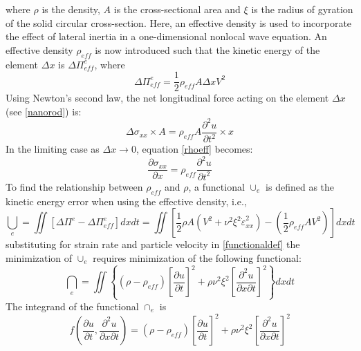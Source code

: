 where $\rho$ is the density, $A$ is the cross-sectional area and $\xi$ is the
radius of gyration of the solid circular cross-section. Here, an
effective density is used to incorporate the effect of lateral inertia in
a one-dimensional nonlocal wave equation. An effective density $\rho_{eff}$ is now introduced such that the kinetic energy of the element $\Delta x$ is $\Delta \Pi^e_{eff}$, where\\
\begin{equation}
\Delta \Pi^e_{eff} =\frac{1}{2} \rho_{eff} A \Delta x V^2
\end{equation}
Using Newton’s second law, the net longitudinal force acting on the
element $\Delta x$ (see \ref{nanorod}) is:\\
\begin{equation}
\Delta \sigma_{xx} \times A = \rho_{eff} A \frac{\partial^2 u}{\partial t^2} \times x
\label{rhoeff}
\end{equation}
In the limiting case as $\Delta x \rightarrow 0$, equation \ref{rhoeff} becomes:\\
\begin{equation}
\frac{\partial \sigma_{xx}}{\partial x} = \rho_{eff} \frac{\partial^2 u}{\partial t^2}
\label{limcasesigma}
\end{equation}
To find the relationship between $\rho_{eff}$ and $\rho$, a functional $\cup_e$ is defined as the kinetic energy error when using the effective density, i.e.,\\
\begin{equation}
\bigcup_e = \iint [\Delta \Pi^e - \Delta \Pi^e_{eff} ] dx dt = 
\iint \left[ \dfrac{1}{2} \rho A (V^2 + \nu^2 \xi^2 \dot{\varepsilon}^2_{xx}) - 
\left( \dfrac{1}{2} \rho_{eff} A V^2 \right) \right] dx dt
\label{functionaldef}
\end{equation}
substituting for strain rate and particle velocity in \eqref{functionaldef} the
minimization of $\cup_e$ requires minimization of the following functional:\\
\begin{equation}
\bigcap_e = \iint \left\lbrace (\rho - \rho_{eff}) \left[\dfrac{\partial u}{\partial t}\right]^2 + \rho \nu^2 \xi^2 \left[ \dfrac{\partial^2 u}{\partial x \partial t} \right]^2 \right\rbrace dx dt
\end{equation}
The integrand of the functional $\cap_e$ is\\
\begin{equation}
f\left(\dfrac{\partial u}{\partial t},\dfrac{\partial^2 u}{\partial x \partial t}\right) = (\rho - \rho_{eff}) \left[\dfrac{\partial u}{\partial t}\right]^2 + \rho \nu^2 \xi^2 \left[ \dfrac{\partial^2 u}{\partial x \partial t}\right]^2
\label{func2}
\end{equation}
